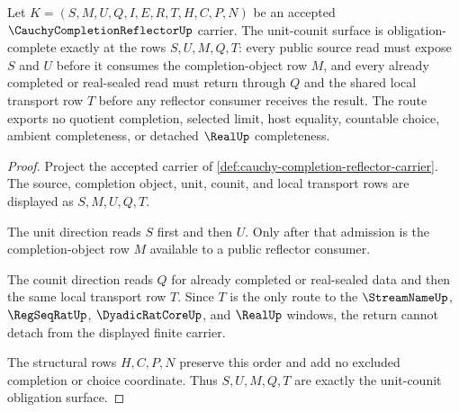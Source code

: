 \begin{theorem}
\label{thm:cauchy-completion-reflector-unit-counit-obligation}
Let $K=(S,M,U,Q,I,E,R,T,H,C,P,N)$ be an accepted $\CauchyCompletionReflectorUp$ carrier. The unit-counit surface is obligation-complete exactly at the rows $S,U,M,Q,T$: every public source read must expose $S$ and $U$ before it consumes the completion-object row $M$, and every already completed or real-sealed read must return through $Q$ and the shared local transport row $T$ before any reflector consumer receives the result. The route exports no quotient completion, selected limit, host equality, countable choice, ambient completeness, or detached $\RealUp$ completeness.
\end{theorem}
\begin{proof}
Project the accepted carrier of \autoref{def:cauchy-completion-reflector-carrier}. The source, completion object, unit, counit, and local transport rows are displayed as $S,M,U,Q,T$.

The unit direction reads $S$ first and then $U$. Only after that admission is the completion-object row $M$ available to a public reflector consumer.

The counit direction reads $Q$ for already completed or real-sealed data and then the same local transport row $T$. Since $T$ is the only route to the $\StreamNameUp$, $\RegSeqRatUp$, $\DyadicRatCoreUp$, and $\RealUp$ windows, the return cannot detach from the displayed finite carrier.

The structural rows $H,C,P,N$ preserve this order and add no excluded completion or choice coordinate. Thus $S,U,M,Q,T$ are exactly the unit-counit obligation surface.
\end{proof}

